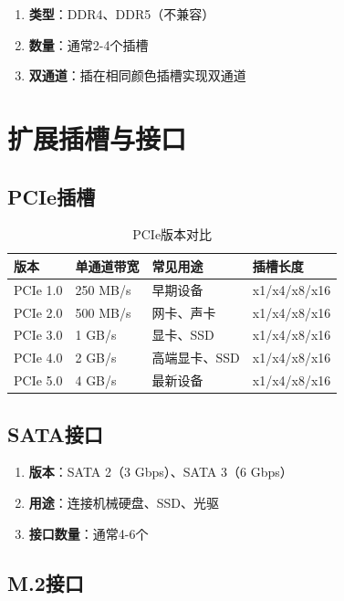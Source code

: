 \documentclass[12pt,UTF8]{ctexbook}
\begin{document}
\begin{enumerate}
    \item \textbf{类型}：DDR4、DDR5（不兼容）
    \item \textbf{数量}：通常2-4个插槽
    \item \textbf{双通道}：插在相同颜色插槽实现双通道
\end{enumerate}

\chapter{扩展插槽与接口}

\section{PCIe插槽}

\begin{table}[H]
    \centering
    \begin{tabular}{|p{2cm}|p{3cm}|p{4cm}|p{3cm}|}
        \hline
        \textbf{版本} & \textbf{单通道带宽} & \textbf{常见用途} & \textbf{插槽长度} \\
        \hline
        PCIe 1.0 & 250 MB/s & 早期设备 & x1/x4/x8/x16 \\
        \hline
        PCIe 2.0 & 500 MB/s & 网卡、声卡 & x1/x4/x8/x16 \\
        \hline
        PCIe 3.0 & 1 GB/s & 显卡、SSD & x1/x4/x8/x16 \\
        \hline
        PCIe 4.0 & 2 GB/s & 高端显卡、SSD & x1/x4/x8/x16 \\
        \hline
        PCIe 5.0 & 4 GB/s & 最新设备 & x1/x4/x8/x16 \\
        \hline
    \end{tabular}
    \caption{PCIe版本对比}
    \label{tab:pcie_versions}
\end{table}

\section{SATA接口}

\begin{enumerate}
    \item \textbf{版本}：SATA 2（3 Gbps）、SATA 3（6 Gbps）
    \item \textbf{用途}：连接机械硬盘、SSD、光驱
    \item \textbf{接口数量}：通常4-6个
\end{enumerate}

\section{M.2接口}
\end{document}
